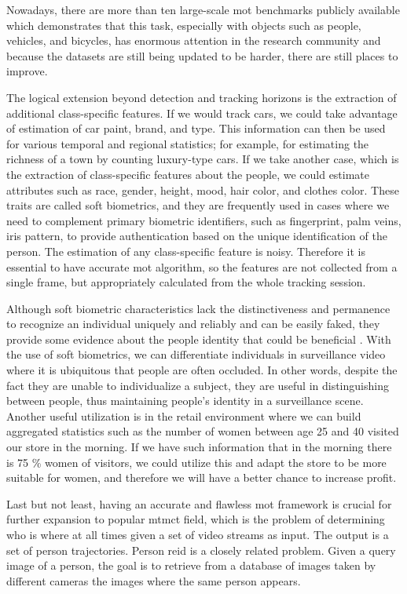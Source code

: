 \begin{introduction}
        Nowadays, there are more than ten large-scale \gls{mot} benchmarks publicly available which demonstrates that this task, especially with objects such as people, vehicles, and bicycles, has enormous attention in the research community and because the datasets are still being updated to be harder, there are still places to improve. 
        
        The logical extension beyond detection and tracking horizons is the extraction of additional class-specific features. If we would track cars, we could take advantage of estimation of car paint, brand, and type. This information can then be used for various temporal and regional statistics; for example, for estimating the richness of a town by counting luxury-type cars. If we take another case, which is the extraction of class-specific features about the people, we could estimate attributes such as race, gender, height, mood, hair color, and clothes color. These traits are called soft biometrics, and they are frequently used in cases where we need to complement primary biometric identifiers, such as fingerprint, palm veins, iris pattern, to provide authentication based on the unique identification of the person. The estimation of any class-specific feature is noisy. Therefore it is essential to have accurate \gls{mot} algorithm, so the features are not collected from a single frame, but appropriately calculated from the whole tracking session.
        
        Although soft biometric characteristics lack the distinctiveness and permanence to recognize an individual uniquely and reliably and can be easily faked, they provide some evidence about the people identity that could be beneficial \cite{wiki:biometrics}. With the use of soft biometrics, we can differentiate individuals in surveillance video where it is ubiquitous that people are often occluded. In other words, despite the fact they are unable to individualize a subject, they are useful in distinguishing between people, thus maintaining people's identity in a surveillance scene. Another useful utilization is in the retail environment where we can build aggregated statistics such as the number of women between age 25 and 40 visited our store in the morning. If we have such information that in the morning there is 75 \% women of visitors, we could utilize this and adapt the store to be more suitable for women, and therefore we will have a better chance to increase profit.
        
        Last but not least, having an accurate and flawless \gls{mot} framework is crucial for further expansion to popular \gls{mtmct} field, which is the problem of determining who is where at all times given a set of video streams as input. The output is a set of person trajectories. Person \gls{reid} is a closely related problem. Given a query image of a person, the goal is to retrieve from a database of images taken by different cameras the images where the same person appears. \cite{ristani2016MTMC}
        

\end{introduction}
